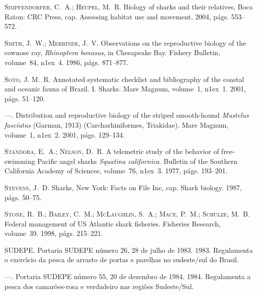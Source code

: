 \documentclass[a4paper,11pt,twoside,showtrims,onecolumn,openright,final]{memoir}
\begin{document}
\begin{thebibliography}{194}
\textsc{Simpfendorfer, C.~A.; Heupel, M.~R.}
\newblock Biology of sharks and their relatives, Boca Raton: CRC Press, cap.
  Assessing habitat use and movement. 2004, p\'ags. 553--572.

\textsc{Smith, J.~W.; Merriner, J.~V.}
\newblock Observations on the reproductive biology of the cownose ray,
  \emph{{R}hinoptera bonasus}, in {C}hesapeake {B}ay.
\newblock Fishery Bulletin, volume~84, n\raise1ex\hbox{}~4. 1986, p\'ags. 871--877.

\textsc{Soto, J. M.~R.}
\newblock Annotated systematic checklist and bibliography of the coastal and
  oceanic fauna of {B}razil. {I}. {S}harks.
\newblock Mare Magnum, volume~1, n\raise1ex\hbox{}~1.
  2001{}, p\'ags. 51--120.

---.
\newblock Distribution and reproductive biology of the striped smooth-hound
  \emph{{M}ustelus fasciatus} ({G}arman, 1913) ({C}archarhiniformes, {T}riakidae).
\newblock Mare Magnum, volume~1, n\raise1ex\hbox{}~2.
  2001{}, p\'ags. 129--134.

\textsc{Standora, E.~A.; Nelson, D.~R.}
\newblock A telemetric study of the behavior of free-swimming {P}acific angel
  sharks \emph{{S}quatina californica}.
\newblock Bulletin of the Southern California Academy of Sciences, volume~76,
  n\raise1ex\hbox{}~3. 1977, p\'ags. 193--201.

\textsc{Stevens, J.~D.}
\newblock Sharks, New York: Facts on File Inc, cap. Shark biology. 1987,
  p\'ags. 50--75.

\textsc{Stone, R.~B.; Bailey, C.~M.; McLaughlin, S.~A.; Mace, P.~M.; Schulze,
  M.~B.}
\newblock Federal management of {US} {A}tlantic shark fisheries.
\newblock Fisheries Research, volume~39. 1998, p\'ags. 215--221.

\textsc{SUDEPE}.
\newblock Portaria {SUDEPE} n\'umero 26, 28 de julho de 1983. 1983.
\newblock Regulamenta o exerc\'{\i}cio da pesca de arrasto de portas e parelhas
  no sudeste/sul do Brasil.

---.
\newblock Portaria {SUDEPE} n\'umero 55, 20 de dezembro de 1984. 1984.
\newblock Regulamenta a pesca dos camar\~oes-rosa e verdadeiro nas regi\~oes
  Sudeste/Sul.


\end{thebibliography}
\end{document}
